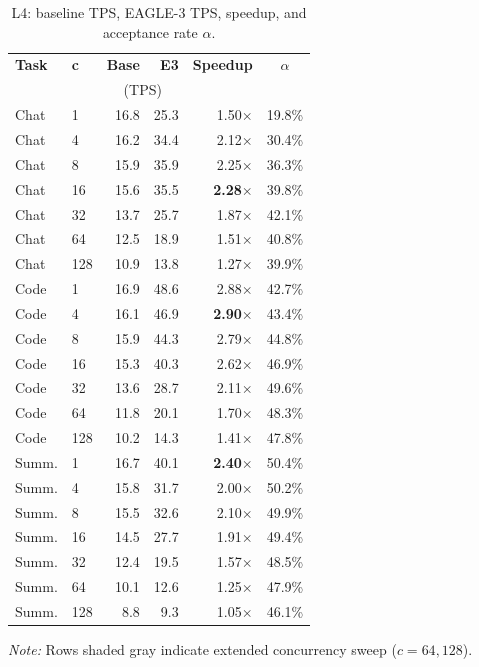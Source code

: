 \documentclass[10pt,twocolumn]{article}
\begin{document}
\begin{table}[h]
\centering
\caption{L4: baseline TPS, EAGLE-3 TPS, speedup, and acceptance rate $\alpha$.}
\label{tab:l4}
\small
\setlength{\tabcolsep}{4pt}
\begin{tabular}{llrrrc}
\toprule
\textbf{Task} & \textbf{c} & \textbf{Base} & \textbf{E3} & \textbf{Speedup} & $\alpha$ \\
              &            & \multicolumn{2}{c}{(TPS)} & & \\
\midrule
Chat & 1  & 16.8 & 25.3  & 1.50$\times$ & 19.8\% \\
Chat & 4  & 16.2 & 34.4  & 2.12$\times$ & 30.4\% \\
Chat & 8  & 15.9 & 35.9  & 2.25$\times$ & 36.3\% \\
Chat & 16 & 15.6 & 35.5  & \textbf{2.28}$\times$ & 39.8\% \\
Chat & 32 & 13.7 & 25.7  & 1.87$\times$ & 42.1\% \\
\rowcolor{gray!15}
Chat & 64  & 12.5 & 18.9 & 1.51$\times$ & 40.8\% \\
\rowcolor{gray!15}
Chat & 128 & 10.9 & 13.8 & 1.27$\times$ & 39.9\% \\
\midrule
Code & 1  & 16.9 & 48.6  & 2.88$\times$ & 42.7\% \\
Code & 4  & 16.1 & 46.9  & \textbf{2.90}$\times$ & 43.4\% \\
Code & 8  & 15.9 & 44.3  & 2.79$\times$ & 44.8\% \\
Code & 16 & 15.3 & 40.3  & 2.62$\times$ & 46.9\% \\
Code & 32 & 13.6 & 28.7  & 2.11$\times$ & 49.6\% \\
\rowcolor{gray!15}
Code & 64  & 11.8 & 20.1 & 1.70$\times$ & 48.3\% \\
\rowcolor{gray!15}
Code & 128 & 10.2 & 14.3 & 1.41$\times$ & 47.8\% \\
\midrule
Summ. & 1  & 16.7 & 40.1  & \textbf{2.40}$\times$ & 50.4\% \\
Summ. & 4  & 15.8 & 31.7  & 2.00$\times$ & 50.2\% \\
Summ. & 8  & 15.5 & 32.6  & 2.10$\times$ & 49.9\% \\
Summ. & 16 & 14.5 & 27.7  & 1.91$\times$ & 49.4\% \\
Summ. & 32 & 12.4 & 19.5  & 1.57$\times$ & 48.5\% \\
\rowcolor{gray!15}
Summ. & 64  & 10.1 & 12.6 & 1.25$\times$ & 47.9\% \\
\rowcolor{gray!15}
Summ. & 128 & 8.8  & 9.3  & 1.05$\times$ & 46.1\% \\
\bottomrule
\end{tabular}
\vspace{0.35cm}

{\small \textit{Note:} Rows shaded gray indicate extended concurrency sweep ($c=64, 128$).}
\end{table}
\end{document}
